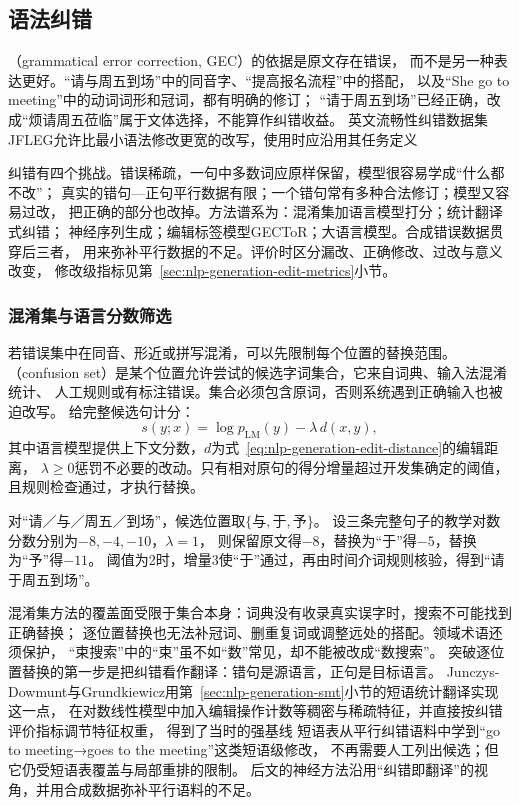 \subsection{语法纠错}
\label{sec:nlp-generation-correction}

（grammatical error correction, GEC）的依据是原文存在错误，
而不是另一种表达更好。“请与周五到场”中的同音字、“提高报名流程”中的搭配，
以及“She go to meeting”中的动词词形和冠词，都有明确的修订；
“请于周五到场”已经正确，改成“烦请周五莅临”属于文体选择，不能算作纠错收益。
英文流畅性纠错数据集JFLEG允许比最小语法修改更宽的改写，使用时应沿用其任务定义

纠错有四个挑战。错误稀疏，一句中多数词应原样保留，模型很容易学成“什么都不改”；
真实的错句—正句平行数据有限；一个错句常有多种合法修订；模型又容易过改，
把正确的部分也改掉。方法谱系为：混淆集加语言模型打分；统计翻译式纠错；
神经序列生成；编辑标签模型GECToR；大语言模型。合成错误数据贯穿后三者，
用来弥补平行数据的不足。评价时区分漏改、正确修改、过改与意义改变，
修改级指标见第~\ref{sec:nlp-generation-edit-metrics}小节。

\subsubsection{混淆集与语言分数筛选}
\label{sec:nlp-generation-confusion}

若错误集中在同音、形近或拼写混淆，可以先限制每个位置的替换范围。
（confusion set）是某个位置允许尝试的候选字词集合，它来自词典、输入法混淆统计、
人工规则或有标注错误。集合必须包含原词，否则系统遇到正确输入也被迫改写。
给完整候选句计分：
\begin{equation}
  s(y;x)=\log p_{\mathrm{LM}}(y)-\lambda\,d(x,y),
  \label{eq:nlp-generation-confusion-score}
\end{equation}
其中语言模型提供上下文分数，$d$为式~\eqref{eq:nlp-generation-edit-distance}的编辑距离，
$\lambda\geq0$惩罚不必要的改动。只有相对原句的得分增量超过开发集确定的阈值，
且规则检查通过，才执行替换。

对“请／与／周五／到场”，候选位置取$\{\text{与},\text{于},\text{予}\}$。
设三条完整句子的教学对数分数分别为$-8,-4,-10$，$\lambda=1$，
则保留原文得$-8$，替换为“于”得$-5$，替换为“予”得$-11$。
阈值为2时，增量3使“于”通过，再由时间介词规则核验，得到“请于周五到场”。

混淆集方法的覆盖面受限于集合本身：词典没有收录真实误字时，搜索不可能找到正确替换；
逐位置替换也无法补冠词、删重复词或调整远处的搭配。领域术语还须保护，
“束搜索”中的“束”虽不如“数”常见，却不能被改成“数搜索”。
突破逐位置替换的第一步是把纠错看作翻译：错句是源语言，正句是目标语言。
Junczys-Dowmunt与Grundkiewicz用第~\ref{sec:nlp-generation-smt}小节的短语统计翻译实现这一点，
在对数线性模型中加入编辑操作计数等稠密与稀疏特征，并直接按纠错评价指标调节特征权重，
得到了当时的强基线
短语表从平行纠错语料中学到“go to meeting→goes to the meeting”这类短语级修改，
不再需要人工列出候选；但它仍受短语表覆盖与局部重排的限制。
后文的神经方法沿用“纠错即翻译”的视角，并用合成数据弥补平行语料的不足。

